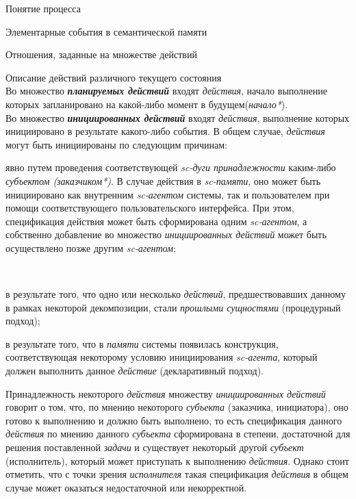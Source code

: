 \begin{frame}{\large Понятие процесса}
\begin{frame}{\large Элементарные события в семантической памяти}
\begin{frame}{Отношения, заданные на множестве действий}
\begin{frame}{Описание действий различного текущего состояния}
\topline
 \\
\bigskip
    Во множество \textbf{\textit{планируемых действий}} входят \textit{действия}, начало выполнение которых запланировано на какой-либо момент в будущем(\textit{начало*}).\\
    Во множество \textbf{\textit{инициированных действий}} входят \textit{действия}, выполнение которых инициировано в результате какого-либо события.
    В общем случае, \textit{действия} могут быть инициированы по следующим причинам:
    \begin{textitemize}
	   \item явно путем проведения соответствующей \textit{sc-дуги принадлежности} каким-либо \textit{субъектом (заказчиком*)}. В случае действия в \textit{sc-памяти}, оно может быть инициировано как внутренним \textit{sc-агентом} системы, так и пользователем при помощи соответствующего пользовательского интерфейса. При этом, спецификация действия может быть сформирована одним \textit{sc-агентом}, а собственно добавление во множество \textit{инициированных действий} может быть осуществлено позже другим \textit{sc-агентом};
    \end{textitemize}
    \end{frame}
    \begin{frame}{}
     \\
     \bigskip
    \begin{textitemize}
    \item в результате того, что одно или несколько \textit{действий}, предшествовавших данному в рамках некоторой декомпозиции, стали \textit{прошлыми сущностями} (процедурный подход);
	   \item в результате того, что в \textit{памяти} системы появилась конструкция, соответствующая некоторому условию инициирования \textit{sc-агента}, который должен выполнить данное \textit{действие} (декларативный подход).
\end{textitemize}
    Принадлежность некоторого \textit{действия} множеству \textit{инициированных действий} говорит о том, что, по мнению некоторого \textit{субъекта} (заказчика, инициатора), оно готово к выполнению и должно быть выполнено, то есть спецификация данного \textit{действия} по мнению данного \textit{субъекта} сформирована в степени, достаточной для решения поставленной \textit{задачи} и существует некоторый другой \textit{субъект} (исполнитель), который может приступать к выполнению \textit{действия}. Однако стоит отметить, что с точки зрения \textit{исполнителя} такая спецификация \textit{действия} в общем случае может оказаться недостаточной или некорректной.\\

\end{frame}
\end{frame}
\end{frame}
\end{frame}
